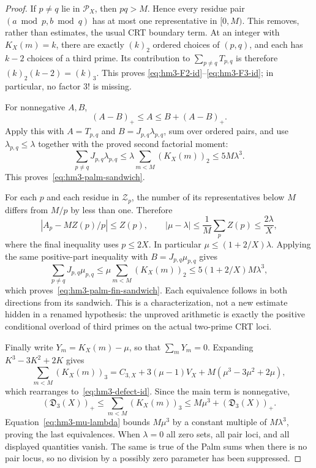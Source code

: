 \begin{proof}
If $p\ne q$ lie in $\mathcal P_X$, then $pq>M$.  Hence every residue
pair $(a\bmod p,b\bmod q)$ has at most one representative in $[0,M)$.
This removes, rather than estimates, the usual CRT boundary term.  At an
integer with $K_X(m)=k$, there are exactly $(k)_2$ ordered choices of
$(p,q)$, and each has $k-2$ choices of a third prime.  Its contribution
to $\sum_{p\ne q}T_{p,q}$ is therefore
$(k)_2(k-2)=(k)_3$.  This proves
\eqref{eq:hm3-F2-id}--\eqref{eq:hm3-F3-id}; in particular, no factor $3!$
is missing.

For nonnegative $A,B$,
\[
  (A-B)_+\le A\le B+(A-B)_+.
\]
Apply this with $A=T_{p,q}$ and $B=J_{p,q}\lambda_{p,q}$, sum over
ordered pairs, and use $\lambda_{p,q}\le\lambda$ together with the
proved second factorial moment:
\[
  \sum_{p\ne q}J_{p,q}\lambda_{p,q}
  \le\lambda\sum_{m<M}(K_X(m))_2
  \le5M\lambda^3.
\]
This proves~\eqref{eq:hm3-palm-sandwich}.

For each $p$ and each residue in $\mathcal Z_p$, the number of its
representatives below $M$ differs from $M/p$ by less than one.  Therefore
\[
  |A_p-MZ(p)/p|\le Z(p),
  \qquad
  |\mu-\lambda|\le\frac1M\sum_pZ(p)
       \le\frac{2\lambda}{X},                          \label{eq:hm3-mu-lambda}
\]
where the final inequality uses $p\le2X$.  In particular
$\mu\le(1+2/X)\lambda$.  Applying the same positive-part inequality
with $B=J_{p,q}\mu_{p,q}$ gives
\[
  \sum_{p\ne q}J_{p,q}\mu_{p,q}
  \le\mu\sum_{m<M}(K_X(m))_2
  \le5(1+2/X)M\lambda^3,
\]
which proves~\eqref{eq:hm3-palm-fin-sandwich}.  Each equivalence follows
in both directions from its sandwich.  This is a characterization, not a
new estimate hidden in a renamed hypothesis: the unproved arithmetic is
exactly the positive conditional overload of third primes on the actual
two-prime CRT loci.

Finally write $Y_m=K_X(m)-\mu$, so that $\sum_mY_m=0$.  Expanding
$K^3-3K^2+2K$ gives
\[
 \sum_{m<M}(K_X(m))_3
 =C_{3,X}+3(\mu-1)V_X+M(\mu^3-3\mu^2+2\mu),
\]
which rearranges to~\eqref{eq:hm3-defect-id}.  Since the main term is
nonnegative,
\[
  (\mathfrak D_3(X))_+
  \le\sum_{m<M}(K_X(m))_3
  \le M\mu^3+(\mathfrak D_3(X))_+.
\]
Equation~\eqref{eq:hm3-mu-lambda} bounds $M\mu^3$ by a constant multiple
of $M\lambda^3$, proving the last equivalences.  When $\lambda=0$ all
zero sets, all pair loci, and all displayed quantities vanish.  The same
is true of the Palm sums when there is no pair locus, so no division by a
possibly zero parameter has been suppressed.
\end{proof}

